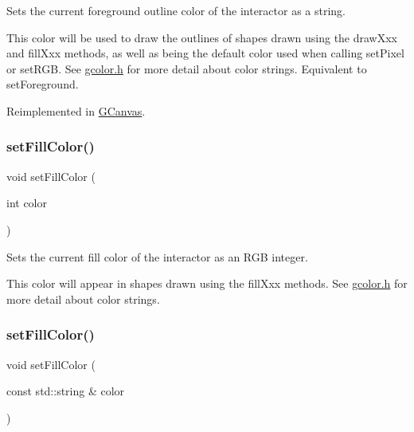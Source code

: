 Sets the current foreground outline color of the interactor as a string. 

This color will be used to draw the outlines of shapes drawn using the draw\+Xxx and fill\+Xxx methods, as well as being the default color used when calling set\+Pixel or set\+R\+GB. See \mbox{\hyperlink{gcolor_8h_source}{gcolor.\+h}} for more detail about color strings. Equivalent to set\+Foreground. 

Reimplemented in \mbox{\hyperlink{classsgl_1_1GCanvas_a56845b1accc47aa881d05939eef6996c}{G\+Canvas}}.

\mbox{\label{classsgl_1_1GDrawingSurface_a47fad447b715f2f303538434eed26709}} 
\subsubsection{\texorpdfstring{set\+Fill\+Color()}{setFillColor()}\hspace{0.1cm}{\footnotesize\ttfamily [1/2]}}
{\footnotesize\ttfamily void set\+Fill\+Color (\begin{DoxyParamCaption}\item[{int}]{color }\end{DoxyParamCaption})\hspace{0.3cm}{\ttfamily [virtual]}}



Sets the current fill color of the interactor as an R\+GB integer. 

This color will appear in shapes drawn using the fill\+Xxx methods. See \mbox{\hyperlink{gcolor_8h_source}{gcolor.\+h}} for more detail about color strings. \mbox{\label{classsgl_1_1GDrawingSurface_adbc18b1a930aadd97d7437f9f7265b96}} 
\subsubsection{\texorpdfstring{set\+Fill\+Color()}{setFillColor()}\hspace{0.1cm}{\footnotesize\ttfamily [2/2]}}
{\footnotesize\ttfamily void set\+Fill\+Color (\begin{DoxyParamCaption}\item[{const std\+::string \&}]{color }\end{DoxyParamCaption})\hspace{0.3cm}{\ttfamily [virtual]}}



